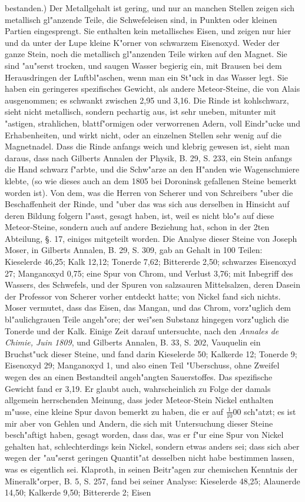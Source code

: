 \documentclass[a4paper, 11pt, oneside, polutonikogreek, german]{article}
\begin{document}
bestanden.) Der Metallgehalt ist gering, und nur an manchen Stellen zeigen sich metallisch gl"anzende Teile, die Schwefeleisen sind, in Punkten oder kleinen Partien eingesprengt. Sie enthalten kein metallisches Eisen, und zeigen nur hier und da unter der Lupe kleine K"orner von schwarzem Eisenoxyd. Weder der ganze Stein, noch die metallisch gl"anzenden Teile wirken auf den Magnet. Sie sind "au"serst trocken, und saugen Wasser begierig ein, mit Brausen bei dem Herausdringen der Luftbl"aschen, wenn man ein St"uck in das Wasser legt. Sie haben ein geringeres spezifisches Gewicht, als andere Meteor-Steine, die von Alais ausgenommen; es schwankt zwischen 2,95 und 3,16. Die Rinde ist kohlschwarz, sieht nicht metallisch, sondern pechartig aus, ist sehr uneben, mitunter mit "astigen, strahlichen, blattf"ormigen oder verworrenen Adern, voll Eindr"ucke und Erhabenheiten, und wirkt nicht, oder an einzelnen Stellen sehr wenig auf die Magnetnadel. Dass die Rinde anfangs weich und klebrig gewesen ist, sieht man daraus, dass nach Gilberts Annalen der Physik, B. 29, S. 233, ein Stein anfangs die Hand schwarz f"arbte, und die Schw"arze an den H"anden wie Wagenschmiere klebte, (so wie dieses auch an dem 1805 bei Doroninsk gefallenen Steine bemerkt worden ist). Von dem, was die Herren von Scherer und von Schreibers "uber die Beschaffenheit der Rinde, und "uber das was sich aus derselben in Hinsicht auf deren Bildung folgern l"asst, gesagt haben, ist, weil es nicht blo"s auf diese Meteor-Steine, sondern auch auf andere Beziehung hat, schon in der 2ten Abteilung, §. 17, einiges mitgeteilt worden. Die Analyse dieser Steine von Joseph Moser, in Gilberts Annalen, B. 29, S. 309, gab an Gehalt in 100 Teilen: Kieselerde 46,25; Kalk 12,12; Tonerde 7,62; Bittererde 2,50; schwarzes Eisenoxyd 27; Manganoxyd 0,75; eine Spur von Chrom, und Verlust 3,76; mit Inbegriff des Wassers, des Schwefels, und der Spuren von salzsauren Mittelsalzen, deren Dasein der Professor von Scherer vorher entdeckt hatte; von Nickel fand sich nichts. Moser vermutet, dass das Eisen, das Mangan, und das Chrom, vorz"uglich dem bl"aulichgrauen Teile angeh"ore; der wei"sen Substanz hingegen vorz"uglich die Tonerde und der Kalk. Einige Zeit darauf untersuchte, nach den \emph{Annales de Chimie, Juin 1809}, und Gilberts Annalen, B. 33, S. 202, Vauquelin ein Bruchst"uck dieser Steine, und fand darin Kieselerde 50; Kalkerde 12; Tonerde 9; Eisenoxyd 29; Manganoxyd 1, und also einen Teil "Uberschuss, ohne Zweifel wegen des an einen Bestandteil angeh"angten Sauerstoffes. Das spezifische Gewicht fand er 3,19. Er glaubt auch, wahrscheinlich zu Folge der damals allgemein herrschenden Meinung, dass jeder Meteor-Stein Nickel enthalten m"usse, eine kleine Spur davon bemerkt zu haben, die er auf $\mathfrak{\frac{1}{10}00}$ sch"atzt; es ist mir aber von Gehlen und Andern, die sich mit Untersuchung dieser Steine besch"aftigt haben, gesagt worden, dass das, was er f"ur eine Spur von Nickel gehalten hat, schlechterdings kein Nickel, sondern etwas anders sei; dass sich aber wegen der "au"serst geringen Quantit"at desselben nicht habe bestimmen lassen, was es eigentlich sei. Klaproth, in seinen Beitr"agen zur chemischen Kenntnis der Mineralk"orper, B. 5, S. 257, fand bei seiner Analyse: Kieselerde 48,25; Alaunerde 14,50; Kalkerde 9,50; Bittererde 2; Eisen 
\end{document}

